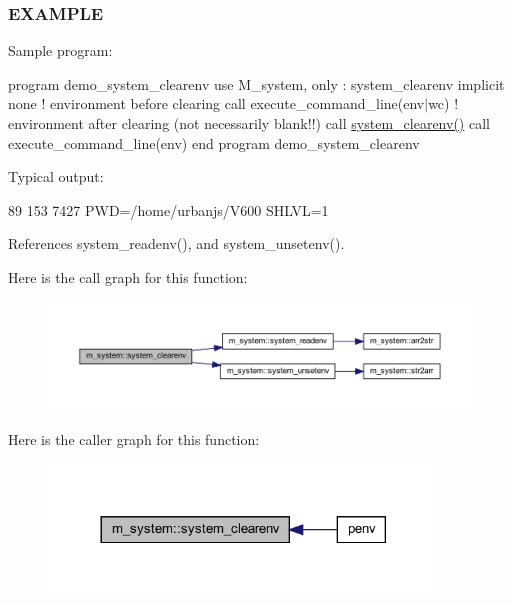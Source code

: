 \subsubsection*{E\+X\+A\+M\+P\+LE}

Sample program\+:

program demo\+\_\+system\+\_\+clearenv use M\+\_\+system, only \+: system\+\_\+clearenv implicit none ! environment before clearing call execute\+\_\+command\+\_\+line(\textquotesingle{}env$\vert$wc\textquotesingle{}) ! environment after clearing (not necessarily blank!!) call \hyperlink{namespacem__system_a9c34787b170ab8d41000d7c3acb60736}{system\+\_\+clearenv()} call execute\+\_\+command\+\_\+line(\textquotesingle{}env\textquotesingle{}) end program demo\+\_\+system\+\_\+clearenv

Typical output\+:

89 153 7427 P\+WD=/home/urbanjs/\+V600 S\+H\+L\+VL=1 

References system\+\_\+readenv(), and system\+\_\+unsetenv().

Here is the call graph for this function\+:
\nopagebreak
\begin{figure}[H]
\begin{center}
\leavevmode
\includegraphics[width=350pt]{namespacem__system_a9c34787b170ab8d41000d7c3acb60736_cgraph}
\end{center}
\end{figure}
Here is the caller graph for this function\+:
\nopagebreak
\begin{figure}[H]
\begin{center}
\leavevmode
\includegraphics[width=293pt]{namespacem__system_a9c34787b170ab8d41000d7c3acb60736_icgraph}
\end{center}
\end{figure}
\mbox{\label{namespacem__system_acd442b52c64fc50482bc08b0ac8a50d1}} 

